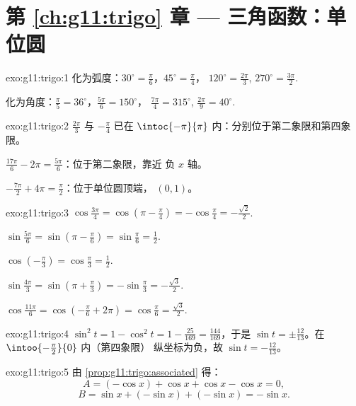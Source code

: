 \section*{第 \ref{ch:g11:trigo} 章 --- 三角函数：单位圆}

\begin{solution}{exo:g11:trigo:1}
化为弧度：$30^\circ = \frac{\pi}{6}$，$45^\circ = \frac{\pi}{4}$，
$120^\circ = \frac{2\pi}{3}$, $270^\circ = \frac{3\pi}{2}$.

化为角度：$\frac{\pi}{5} = 36^\circ$，$\frac{5\pi}{6} = 150^\circ$，
$\frac{7\pi}{4} = 315^\circ$, $\frac{2\pi}{9} = 40^\circ$.
\end{solution}

\begin{solution}{exo:g11:trigo:2}
$\frac{2\pi}{3}$ 与 $-\frac{\pi}{4}$ 已在
$\intoc{-\pi}{\pi}$ 内：分别位于第二象限和第四象限。

$\frac{17\pi}{6} - 2\pi = \frac{5\pi}{6}$：位于第二象限，靠近
负 $x$ 轴。

$-\frac{7\pi}{2} + 4\pi = \frac{\pi}{2}$：位于单位圆顶端，
$(0, 1)$。
\end{solution}

\begin{solution}{exo:g11:trigo:3}
$\cos\frac{3\pi}{4} = \cos\left(\pi - \frac\pi4\right)
= -\cos\frac\pi4 = -\frac{\sqrt2}{2}$.

$\sin\frac{5\pi}{6} = \sin\left(\pi - \frac\pi6\right)
= \sin\frac\pi6 = \frac12$.

$\cos\left(-\frac\pi3\right) = \cos\frac\pi3 = \frac12$.

$\sin\frac{4\pi}{3} = \sin\left(\pi + \frac\pi3\right)
= -\sin\frac\pi3 = -\frac{\sqrt3}{2}$.

$\cos\frac{11\pi}{6} = \cos\left(-\frac\pi6 + 2\pi\right)
= \cos\frac\pi6 = \frac{\sqrt3}{2}$.
\end{solution}

\begin{solution}{exo:g11:trigo:4}
$\sin^2 t = 1 - \cos^2 t = 1 - \frac{25}{169} = \frac{144}{169}$，于是
$\sin t = \pm\frac{12}{13}$。在 $\intoo{-\frac\pi2}{0}$ 内（第四象限）
纵坐标为负，故 $\sin t = -\frac{12}{13}$。
\end{solution}

\begin{solution}{exo:g11:trigo:5}
由 \cref{prop:g11:trigo:associated} 得：
\[
A = (-\cos x) + \cos x + \cos x - \cos x = 0 ,
\]
\[
B = \sin x + (-\sin x) + (-\sin x) = -\sin x .
\]
\end{solution}

